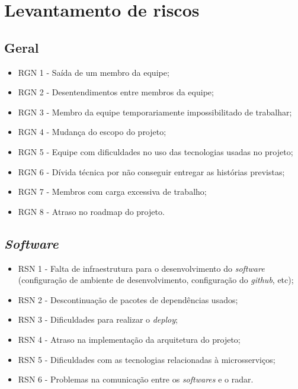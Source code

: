\section{Levantamento de riscos}
\subsection{Geral}

\begin{itemize}
    \item RGN 1 - Saída de um membro da equipe;
    \item RGN 2 - Desentendimentos entre membros da equipe;
    \item RGN 3 - Membro da equipe temporariamente impossibilitado de trabalhar;
    \item RGN 4 - Mudança do escopo do projeto;
    \item RGN 5 - Equipe com dificuldades no uso das tecnologias usadas no projeto;
    \item RGN 6 - Dívida técnica por não conseguir entregar as histórias previstas;
    \item RGN 7 - Membros com carga excessiva de trabalho;
    \item RGN 8 - Atraso no roadmap do projeto.
\end{itemize}

\subsection{\emph{Software}}
\begin{itemize}
    \item RSN 1 - Falta de infraestrutura para o desenvolvimento do \emph{software} (configuração de ambiente de desenvolvimento, configuração do \emph{github}, etc);
    \item RSN 2 - Descontinuação de pacotes de dependências usados;
    \item RSN 3 - Dificuldades para realizar o \emph{deploy};
    \item RSN 4 - Atraso na implementação da arquitetura do projeto;
    \item RSN 5 - Dificuldades com as tecnologias relacionadas à microsserviços;
    \item RSN 6 - Problemas na comunicação entre os \emph{softwares} e o radar.
\end{itemize}

